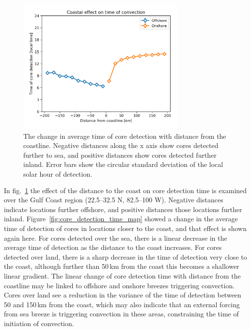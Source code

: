 \begin{figure}[tp]
    \centering
    \includegraphics[width=0.75\textwidth]{figures/chapter2_14.png}
    \caption[
    The change in average time of core detection with distance from the coastline
    ]{
    The change in average time of core detection with distance from the coastline. Negative distances along the x axis show cores detected further to sea, and positive distances show cores detected further inland. Error bars show the circular standard deviation of the local solar hour of detection.
    }
    \label{fig:core_coast_effect}
\end{figure}

In fig.~\ref{fig:core_coast_effect} the effect of the distance to the coast on core detection time is examined over the Gulf Coast region (22.5--32.5\,\textdegree\,N, 82.5--100\,\textdegree\,W).
Negative distances indicate locations further offshore, and positive distances those locations further inland.
Figure~\ref{fig:core_detection_time_map} showed a change in the average time of detection of cores in locations closer to the coast, and that effect is shown again here.
For cores detected over the sea, there is a linear decrease in the average time of detection as the distance to the coast increases.
For cores detected over land, there is a sharp decrease in the time of detection very close to the coast, although further than 50\,\unit{km} from the coast this becomes a shallower linear gradient.
The linear change of core detection time with distance from the coastline may be linked to offshore and onshore breezes triggering convection.
Cores over land see a reduction in the variance of the time of detection between 50 and 150\,\unit{km} from the coast, which may also indicate that an external forcing from sea breeze is triggering convection in these areas, constraining the time of initiation of convection.

